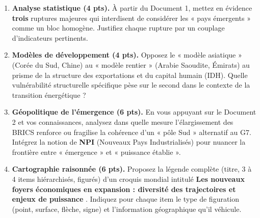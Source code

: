 \documentclass[11pt]{article}
\begin{document}
\begin{exercice}
\begin{enumerate}
\item \textbf{Analyse statistique (4 pts).} À partir du Document 1, mettez en évidence \textbf{trois} ruptures majeures qui interdisent de considérer les « pays émergents » comme un bloc homogène. Justifiez chaque rupture par un couplage d'indicateurs pertinents.
\item \textbf{Modèles de développement (4 pts).} Opposez le « modèle asiatique » (Corée du Sud, Chine) au « modèle rentier » (Arabie Saoudite, Émirats) au prisme de la structure des exportations et du capital humain (IDH). Quelle vulnérabilité structurelle spécifique pèse sur le second dans le contexte de la transition énergétique ?
\item \textbf{Géopolitique de l'émergence (6 pts).} En vous appuyant sur le Document 2 et vos connaissances, analysez dans quelle mesure l'élargissement des BRICS renforce ou fragilise la cohérence d'un « pôle Sud » alternatif au G7. Intégrez la notion de \textbf{NPI} (Nouveaux Pays Industrialisés) pour nuancer la frontière entre « émergence » et « puissance établie ».
\item \textbf{Cartographie raisonnée (6 pts).} Proposez la légende complète (titre, 3 à 4 items hiérarchisés, figurés) d'un croquis mondial intitulé \og \textbf{Les nouveaux foyers économiques en expansion : diversité des trajectoires et enjeux de puissance} \fg. Indiquez pour chaque item le type de figuration (point, surface, flèche, signe) et l'information géographique qu'il véhicule.
\end{enumerate}
\end{exercice}
\end{document}
